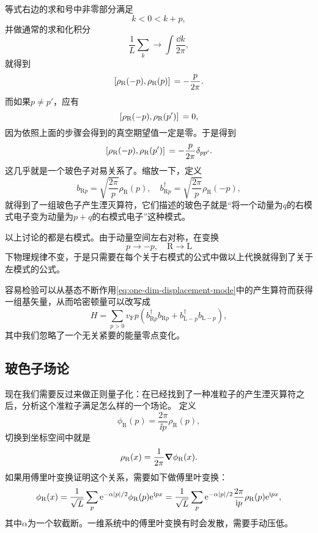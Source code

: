等式右边的求和号中非零部分满足
\[
    k < 0 < k + p,
\]
并做通常的求和化积分
\[
    \frac{1}{L} \sum_k \longrightarrow \int \frac{\dd{k}}{2\pi},
\]
就得到
\[
    \comm*{{\rho}_\text{R}(- p)}{{\rho}_\text{R}(p)} = - \frac{p}{2\pi}.
\]
而如果$p \neq p'$，应有
\[
    \comm*{{\rho}_\text{R}(- p)}{{\rho}_\text{R}(p')} = 0,
\]
因为依照上面的步骤会得到的真空期望值一定是零。于是得到
\begin{equation}
    \comm*{{\rho}_\text{R}(- p)}{{\rho}_\text{R}(p')} = - \frac{p}{2\pi} \delta_{pp'}.
\end{equation}
这几乎就是一个玻色子对易关系了。缩放一下，定义
\begin{equation}
    {b}_{\text{R} p} = \sqrt{\frac{2\pi}{p}} {\rho}_\text{R}(p), \quad {b}^\dagger_{\text{R} p} = \sqrt{\frac{2\pi}{p}} {\rho}_\text{R}(-p),
    \label{eq:one-dim-displacement-mode}
\end{equation}
就得到了一组玻色子产生湮灭算符，它们描述的玻色子就是“将一个动量为$q$的右模式电子变为动量为$p+q$的右模式电子”这种模式。

以上讨论的都是右模式。由于动量空间左右对称，在变换
\[
    p \longrightarrow -p, \quad \text{R} \longrightarrow \text{L}
\]
下物理规律不变，于是只需要在每个关于右模式的公式中做以上代换就得到了关于左模式的公式。

容易检验可以从基态不断作用\eqref{eq:one-dim-displacement-mode}中的产生算符而获得一组基矢量，从而哈密顿量可以改写成
\begin{equation}
    {H} = \sum_{p > 0} v_\text{F} p \left({b}_{\text{R} p}^\dagger {b}_{\text{R} p} + {b}_{\text{L} -p}^\dagger {b}_{\text{L} -p} \right),
    \label{eq:one-dim-displacement-hamiltonian}
\end{equation}
其中我们忽略了一个无关紧要的能量零点变化。

\subsection{玻色子场论}

现在我们需要反过来做正则量子化：在已经找到了一种准粒子的产生湮灭算符之后，分析这个准粒子满足怎么样的一个场论。
定义
\begin{equation}
    {\phi}_\text{R}(p) = \frac{2\pi}{\ii p} {\rho}_\text{R}(p),
    \label{eq:one-dim-phi}
\end{equation}
切换到坐标空间中就是
\[
    {\rho}_\text{R}(x) = \frac{1}{2\pi} \grad \phi_\text{R}(x).
\]
如果用傅里叶变换证明这个关系，需要如下做傅里叶变换：
\begin{equation}
    {\phi}_\text{R} (x) = \frac{1}{\sqrt{L}} \sum_p \mathrm{e}^{- \alpha \abs{p} / 2} \phi_\text{R}(p) \mathrm{e}^{\mathrm{i} p x} = \frac{1}{\sqrt{L}} \sum_p \mathrm{e}^{- \alpha \abs{p} / 2} \frac{2\pi}{\mathrm{i} p} {\rho}_\text{R}(p) \mathrm{e}^{\mathrm{i} p x},
    \label{eq:one-dim-phi-and-rho}
\end{equation}
其中$\alpha$为一个软截断。一维系统中的傅里叶变换有时会发散，需要手动压低。


